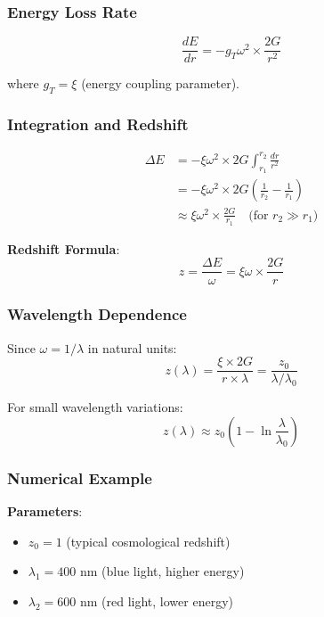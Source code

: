 \documentclass[12pt,a4paper]{article}
\newcommand{\xipar}{\xi}
\begin{document}
	\subsubsection{Energy Loss Rate}
	\begin{equation}
		\frac{dE}{dr} = -g_T \omega^2 \times \frac{2G}{r^2}
		\label{eq:energy_loss_rate}
	\end{equation}
	
	where $g_T = \xipar$ (energy coupling parameter).
	
	\subsubsection{Integration and Redshift}
	\begin{align}
		\Delta E &= -\xipar \omega^2 \times 2G \int_{r_1}^{r_2} \frac{dr}{r^2} \\
		&= -\xipar \omega^2 \times 2G \left(\frac{1}{r_2} - \frac{1}{r_1}\right) \\
		&\approx \xipar \omega^2 \times \frac{2G}{r_1} \quad \text{(for } r_2 \gg r_1\text{)}
		\label{eq:energy_loss_integration}
	\end{align}
	
	\textbf{Redshift Formula}:
	\begin{equation}
		z = \frac{\Delta E}{\omega} = \xipar \omega \times \frac{2G}{r}
		\label{eq:energy_redshift_formula}
	\end{equation}
	
	\subsubsection{Wavelength Dependence}
	Since $\omega = 1/\lambda$ in natural units:
	\begin{equation}
		z(\lambda) = \frac{\xipar \times 2G}{r \times \lambda} = \frac{z_0}{\lambda/\lambda_0}
		\label{eq:wavelength_dependence_energy}
	\end{equation}
	
	For small wavelength variations:
	\begin{equation}
		\boxed{z(\lambda) \approx z_0\left(1 - \ln\frac{\lambda}{\lambda_0}\right)}
		\label{eq:logarithmic_redshift_energy}
	\end{equation}
	
	\subsubsection{Numerical Example}
	\textbf{Parameters}:
	\begin{itemize}
		\item $z_0 = 1$ (typical cosmological redshift)
		\item $\lambda_1 = 400$ nm (blue light, higher energy)
		\item $\lambda_2 = 600$ nm (red light, lower energy)
	\end{itemize}
	
\end{document}
